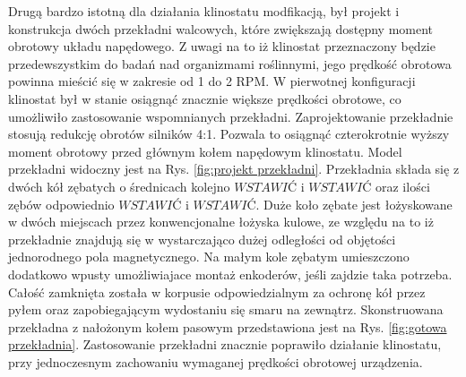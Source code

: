 Drugą bardzo istotną dla działania klinostatu modfikacją, był projekt i konstrukcja dwóch przekładni walcowych, które zwiększają dostępny moment obrotowy układu napędowego. Z uwagi na to iż klinostat przeznaczony będzie przedewszystkim do badań nad organizmami roślinnymi, jego prędkość obrotowa powinna mieścić się w zakresie od 1 do 2 RPM. W pierwotnej konfiguracji klinostat był w stanie osiągnąć znacznie większe prędkości obrotowe, co umożliwiło zastosowanie wspomnianych przekładni. Zaprojektowanie przekładnie stosują redukcję obrotów silników 4:1. Pozwala to osiągnąć czterokrotnie wyższy moment obrotowy przed głównym kołem napędowym klinostatu. Model przekładni widoczny jest na Rys. \ref{fig:projekt przekładni}. Przekładnia składa się z dwóch kół zębatych o średnicach kolejno $WSTAWIĆ$ i $WSTAWIĆ$ oraz ilości zębów odpowiednio $WSTAWIĆ$ i $WSTAWIĆ$. Duże koło zębate jest łożyskowane w dwóch miejscach przez konwencjonalne łożyska kulowe, ze względu na to iż przekładnie znajdują się w wystarczająco dużej odległości od objętości jednorodnego pola magnetycznego. Na małym kole zębatym umieszczono dodatkowo wpusty umożliwiajace montaż enkoderów, jeśli zajdzie taka potrzeba. Całość zamknięta została w korpusie odpowiedzialnym za ochronę kół przez pyłem oraz zapobiegającym wydostaniu się smaru na zewnątrz. Skonstruowana przekładna z nałożonym kołem pasowym przedstawiona jest na Rys. \ref{fig:gotowa przekładnia}. Zastosowanie przekładni znacznie poprawiło działanie klinostatu, przy jednoczesnym zachowaniu wymaganej prędkości obrotowej urządzenia.


